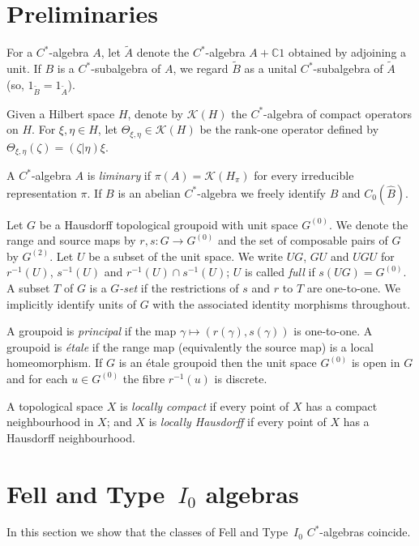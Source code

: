 \documentclass[12pt,a4paper]{amsart}
\newcommand{\field}[1]{\mathbb{#1}}
\newcommand{\CC}{\field{C}}
\newcommand{\Kk}{\mathcal{K}}
\newcommand{\Hh}{{H}}
\begin{document}
\section{Preliminaries}\label{sec:prelim}

For a $C^*$-algebra $A$, let $\widetilde{A}$ denote the
$C^*$-algebra $A + \CC 1$ obtained by adjoining a unit.
If $B$ is a $C^*$-subalgebra of $A$, we regard $\widetilde{B}$
as a unital $C^*$-subalgebra of $\widetilde{A}$
(so, $1_{\widetilde{B}} = 1_{\widetilde{A}}$).

Given a Hilbert space $\Hh$, denote by $\Kk(\Hh)$ the
$C^*$-algebra of compact operators on $\Hh$.  For $\xi, \eta
\in \Hh$, let $\Theta_{\xi,\eta} \in \Kk(\Hh)$ be the rank-one
operator defined by
$\Theta_{\xi,\eta}(\zeta) = (\zeta |\eta)\xi$.

A $C^*$-algebra $A$ is \emph{liminary}
if $\pi(A) =  \Kk(\Hh_\pi)$ for every irreducible representation
$\pi$. If $B$ is an abelian $C^*$-algebra we freely identify $B$ and $C_0(\hat B)$.

Let $G$ be a Hausdorff topological groupoid with unit space
$G^{(0)}$. We denote the range and source maps by $r,s:G\to
G^{(0)}$ and the set of composable pairs of $G$ by $G^{(2)}$.
Let $U$ be a subset of the unit space. We write  $UG$, $GU$ and
$UGU$ for $r^{-1}(U)$, $s^{-1}(U)$ and $r^{-1}(U)\cap
s^{-1}(U)$; $U$ is called \emph{full} \label{def-full} if $s(UG)=G^{(0)}$. A
subset $T$ of $G$ is a \emph{$G$-set} if the
restrictions of $s$ and $r$ to $T$ are one-to-one. We
implicitly identify units of $G$ with the associated identity
morphisms throughout.

A groupoid is \emph{principal} if the map $\gamma\mapsto
(r(\gamma),s(\gamma))$ is one-to-one. A groupoid is
\emph{\'etale} if the range map (equivalently the source map)
is a local homeomorphism.  If $G$ is an \'etale groupoid then
the unit space $G^{(0)}$ is open in $G$ and for each $u\in
G^{(0)}$ the fibre $r^{-1}(u)$ is discrete.

A topological space $X$ is \emph{locally compact} if every point of $X$ has a compact neighbourhood in $X$; and $X$ is  \emph{locally Hausdorff} if every point of $X$ has a Hausdorff neighbourhood.



\section{Fell and Type~\texorpdfstring{$I_0$}{I0} algebras}\label{sec:Fell}
In this section we show that the classes of Fell and  Type~$I_0$ $C^*$-algebras
coincide.
\end{document}
